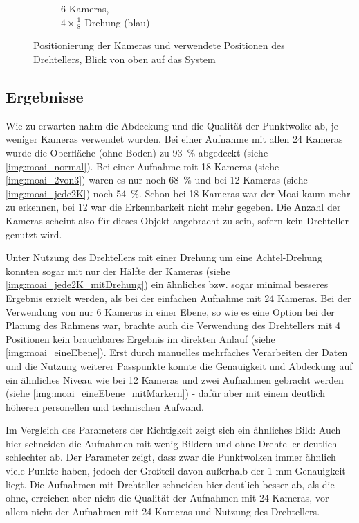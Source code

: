 \documentclass[./00PhotoBox.tex]{subfiles}
\begin{document}
\begin{figure}
\begin{subfigure}{0.48\textwidth}
        \caption{
            6 Kameras, \\
            $4 \times \frac{1}{8}$-Drehung (blau)
        }
        \label{img:kameras_ebene}
    \end{subfigure}
    \caption{Positionierung der Kameras und verwendete Positionen des Drehtellers, Blick von oben auf das System}
    \label{img:ueberblick_cam_position}
\end{figure}


\subsection{Ergebnisse}
Wie zu erwarten nahm die Abdeckung und die Qualität der Punktwolke ab, je weniger Kameras verwendet wurden. Bei einer Aufnahme mit allen 24 Kameras wurde die Oberfläche (ohne Boden) zu \SI{93}{\percent} abgedeckt (siehe \autoref{img:moai_normal}). Bei einer Aufnahme mit 18 Kameras (siehe \autoref{img:moai_2von3}) waren es nur noch \SI{68}{\percent} und bei 12 Kameras (siehe \autoref{img:moai_jede2K}) noch \SI{54}{\percent}.  Schon bei 18 Kameras war der Moai kaum mehr zu erkennen, bei 12 war die Erkennbarkeit nicht mehr gegeben. Die Anzahl der Kameras scheint also für dieses Objekt angebracht zu sein, sofern kein Drehteller genutzt wird.

Unter Nutzung des Drehtellers mit einer Drehung um eine Achtel-Drehung konnten sogar mit nur der Hälfte der Kameras (siehe \autoref{img:moai_jede2K_mitDrehung}) ein ähnliches bzw. sogar minimal besseres Ergebnis erzielt werden, als bei der einfachen Aufnahme mit 24 Kameras. Bei der Verwendung von nur 6 Kameras in einer Ebene, so wie es eine Option bei der Planung des Rahmens war, brachte auch die Verwendung des Drehtellers mit 4 Positionen kein brauchbares Ergebnis im direkten Anlauf (siehe \autoref{img:moai_eineEbene}). Erst durch manuelles mehrfaches Verarbeiten der Daten und die Nutzung weiterer Passpunkte konnte die Genauigkeit und Abdeckung auf ein ähnliches Niveau wie bei 12 Kameras und zwei Aufnahmen gebracht werden (siehe \autoref{img:moai_eineEbene_mitMarkern}) - dafür aber mit einem deutlich höheren personellen und technischen Aufwand.

Im Vergleich des Parameters der Richtigkeit zeigt sich ein ähnliches Bild: Auch hier schneiden die Aufnahmen mit wenig Bildern und ohne Drehteller deutlich schlechter ab. Der Parameter zeigt, dass zwar die Punktwolken immer ähnlich viele Punkte haben, jedoch der Großteil davon außerhalb der 1-mm-Genauigkeit liegt. Die Aufnahmen mit Drehteller schneiden hier deutlich besser ab, als die ohne, erreichen aber nicht die Qualität der Aufnahmen mit 24 Kameras, vor allem nicht der Aufnahmen mit 24 Kameras und Nutzung des Drehtellers.
\end{document}
